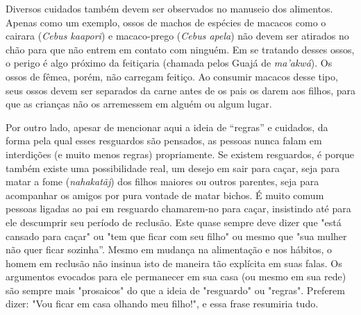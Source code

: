 Diversos cuidados também devem ser observados no manuseio dos alimentos.
Apenas como um exemplo, ossos de machos de espécies de macacos como o
cairara (\emph{Cebus kaapori}) e macaco-prego (\emph{Cebus apela}) não
devem ser atirados no chão para que não entrem em contato com ninguém.
Em se tratando desses ossos, o perigo é algo próximo da feitiçaria
(chamada pelos Guajá de \emph{ma'akwá}). Os ossos de fêmea, porém, não
carregam feitiço. Ao consumir macacos desse tipo, seus ossos devem ser
separados da carne antes de os pais os darem aos filhos, para que as
crianças não os arremessem em alguém ou algum lugar.

Por outro lado, apesar de mencionar aqui a ideia de ``regras'' e
cuidados, da forma pela qual esses resguardos são pensados, as pessoas
nunca falam em interdições (e muito menos regras) propriamente. Se
existem resguardos, é porque também existe uma possibilidade real, um
desejo em sair para caçar, seja para matar a fome (\emph{nahakatãj}) dos
filhos maiores ou outros parentes, seja para acompanhar os amigos por
pura vontade de matar bichos. É muito comum pessoas ligadas ao pai em
resguardo chamarem-no para caçar, insistindo até para ele descumprir seu
período de reclusão. Este quase sempre deve dizer que "está cansado para
caçar" ou "tem que ficar com seu filho" ou mesmo que "sua mulher não
quer ficar sozinha''. Mesmo em mudança na alimentação e nos hábitos, o
homem em reclusão não insinua isto de maneira tão explícita em suas
falas. Os argumentos evocados para ele permanecer em sua casa (ou mesmo
em sua rede) são sempre mais "prosaicos" do que a ideia de "resguardo"
ou "regras". Preferem dizer: "Vou ficar em casa olhando meu filho!", e
essa frase resumiria tudo.

